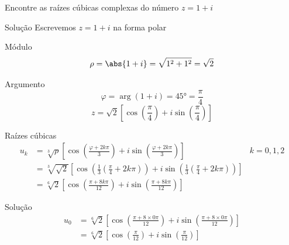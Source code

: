 \begin{question}
  Encontre as raízes cúbicas complexas do número \( z = 1 + i \)
\end{question}

\begin{resolution}{Solução}
Escrevemos \(z = 1 + i\) na forma polar

  Módulo
  \[
    \rho = \abs{1+i} = \sqrt{1^2 + 1^2} = \sqrt{2}
  \]

  Argumento
  \[
    \varphi = \arg(1+i) = \ang{45} = \frac{\pi}{4}
  \]
  \[
    z = \sqrt{2} \left[ \cos\left(\frac{\pi}{4}\right)
                    + i \sin\left(\frac{\pi}{4}\right) \right]
  \]

\end{resolution}

\begin{resolution}{Raízes cúbicas}
\begin{align*}
  u_k
  & = \sqrt[3]{\rho} \left[
  \cos\left(\frac{\varphi + 2k\pi}{3}\right)
  + i \sin\left(\frac{\varphi + 2k\pi}{3}\right)
  \right]
  & k = 0, 1, 2    \\
  & = \sqrt[3]{\sqrt{2}} \left[
  \cos\left(\frac{1}{3}\left(\frac{\pi}{4} + 2k\pi\right)\right)
  + i \sin\left(\frac{1}{3}\left(\frac{\pi}{4} + 2k\pi\right)\right)
  \right] \\
  & = \sqrt[6]{2} \left[
  \cos\left( \frac{\pi + 8k\pi}{12} \right)
  + i \sin\left( \frac{\pi + 8k\pi}{12} \right)
  \right]
\end{align*}
\end{resolution}

\begin{resolution}{Solução}
  \begin{align*}
    u_0
    & = \sqrt[6]{2} \left[
    \cos\left( \frac{\pi + 8\times0\pi}{12} \right)
    + i \sin\left( \frac{\pi + 8\times0\pi}{12} \right)
    \right] \\[2mm]
    & = \sqrt[6]{2} \left[
    \cos\left( \frac{\pi}{12} \right)
    + i \sin\left( \frac{\pi}{12} \right)
    \right]
  \end{align*}
\end{resolution}

